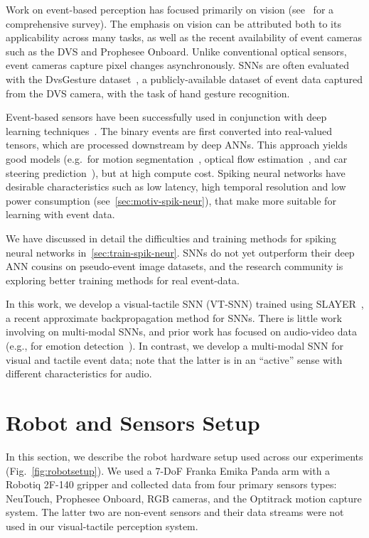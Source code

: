 \documentclass[fyp]{socreport}
\begin{document}
Work on event-based perception has focused primarily on vision
(see~\cite{Gallego2018} for a comprehensive survey). The emphasis on vision can
be attributed both to its applicability across many tasks, as well as the recent
availability of event cameras such as the DVS and Prophesee Onboard. Unlike
conventional optical sensors, event cameras capture pixel changes
asynchronously. SNNs are often evaluated with the DvsGesture
dataset~\cite{dvsgesture}, a publicly-available dataset of event data captured
from the DVS camera, with the task of hand gesture recognition.

Event-based sensors have been successfully used in conjunction with deep
learning techniques~\cite{Gallego2018}. The binary events are first converted
into real-valued tensors, which are processed downstream by deep ANNs. This
approach yields good models (e.g.\ for motion segmentation~\cite{Mitrokhin2019}, optical flow
estimation~\cite{zhu2018ev}, and car steering
prediction~\cite{maqueda2018event}), but at high compute cost. Spiking neural
networks have desirable characteristics such as low latency, high temporal
resolution and low power consumption (see~\autoref{sec:motiv-spik-neur}),
that make more suitable for learning with event data.

We have discussed in detail the difficulties and training methods for spiking
neural networks in~\autoref{sec:train-spik-neur}. SNNs do not yet outperform
their deep ANN cousins on pseudo-event image datasets, and the research
community is exploring better training methods for real event-data.

In this work, we develop a visual-tactile SNN (VT-SNN) trained using
SLAYER~\cite{NIPS2018_7415}, a recent approximate backpropagation method for
SNNs. There is little work involving on multi-modal SNNs, and prior work has
focused on audio-video data~\cite{chevallier2005distributed,Rathi2018} (e.g.,
for emotion detection~\cite{mansouri2019speech}). In contrast, we develop a
multi-modal SNN for visual and tactile event data; note that the latter is in an
``active'' sense with different characteristics for audio.

\chapter{Robot and Sensors Setup\label{cha:exp_setup}}

In this section, we describe the robot hardware setup used across our
experiments (Fig.~\ref{fig:robotsetup}). We used a 7-DoF Franka Emika Panda arm
with a Robotiq 2F-140 gripper and collected data from four primary sensors
types: NeuTouch, Prophesee Onboard, RGB cameras, and the Optitrack motion
capture system. The latter two are non-event sensors and their data streams were
not used in our visual-tactile perception system.
\end{document}
